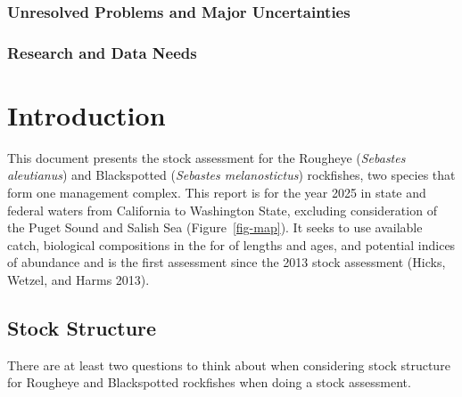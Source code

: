 \documentclass[
]{scrartcl}
\begin{document}
\subsubsection{Unresolved Problems and Major
Uncertainties}\label{unresolved-problems-and-major-uncertainties}

\subsubsection{Research and Data Needs}\label{research-and-data-needs}

\newpage{}

\section{Introduction}\label{introduction}

This document presents the stock assessment for the Rougheye
(\emph{Sebastes aleutianus}) and Blackspotted (\emph{Sebastes
melanostictus}) rockfishes, two species that form one management
complex. This report is for the year 2025 in state and federal waters
from California to Washington State, excluding consideration of the
Puget Sound and Salish Sea (Figure~\ref{fig-map}). It seeks to use
available catch, biological compositions in the for of lengths and ages,
and potential indices of abundance and is the first assessment since the
2013 stock assessment (Hicks, Wetzel, and Harms 2013).

\subsection{Stock Structure}\label{stock-structure}

There are at least two questions to think about when considering stock
structure for Rougheye and Blackspotted rockfishes when doing a stock
assessment.
\end{document}
